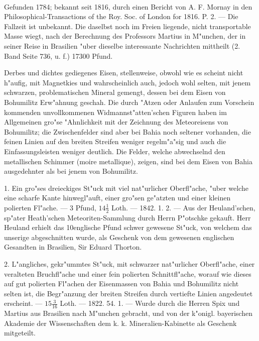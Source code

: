 \documentclass[a4paper, 11pt, oneside, polutonikogreek, german]{article}
\begin{document}
\paragraph{}
Gefunden 1784; bekannt seit 1816, durch einen Bericht von A. F. Mornay in den Philosophical-Transactions of the Roy. Soc. of London for 1816. P. 2. --- Die Fallzeit ist unbekannt. Die daselbst noch im Freien liegende, nicht transportable Masse wiegt, nach der Berechnung des Professors Martius in M"unchen, der in seiner Reise in Brasilien "uber dieselbe interessante Nachrichten mittheilt (2. Band Seite 736, u. f.) 17300 Pfund.

Derbes und dichtes gediegenes Eisen, stellenweise, obwohl wie es scheint nicht h"aufig, mit Magnetkies und wahrscheinlich auch, jedoch wohl selten, mit jenem schwarzen, problematischen Mineral gemengt, dessen bei dem Eisen von Bohumilitz Erw"ahnung geschah. Die durch "Atzen oder Anlaufen zum Vorschein kommenden unvollkommenen Widmannst"atten'schen Figuren haben im Allgemeinen gro"se "Ahnlichkeit mit der Zeichnung des Meteoreisens von Bohumilitz; die Zwischenfelder sind aber bei Bahia noch seltener vorhanden, die feinen Linien auf den breiten Streifen weniger regelm"a"sig und auch die Einfassungsleisten weniger deutlich. Die Felder, welche abwechselnd den metallischen Schimmer (moire metallique), zeigen, sind bei dem Eisen von Bahia ausgedehnter als bei jenem von Bohumilitz.

1. Ein gro"ses dreieckiges St"uck mit viel nat"urlicher Oberfl"ache, "uber welche eine scharfe Kante hinwegl"auft, einer gro"sen ge"atzten und einer kleinen polierten Fl"ache. --- 3 Pfund, $\mathfrak{14\frac{1}{2}}$ Loth. --- 1842. 1. 2. --- Aus der Heuland'schen, sp"ater Heath'schen Meteoriten-Sammlung durch Herrn P"otschke gekauft. Herr Heuland erhielt das 10englische Pfund schwer gewesene St"uck, von welchem das unserige abgeschnitten wurde, als Geschenk von dem gewesenen englischen Gesandten in Brasilien, Sir Eduard Thorton.

2. L"angliches, gekr"ummtes St"uck, mit schwarzer nat"urlicher Oberfl"ache, einer veralteten Bruchfl"ache und einer fein polierten Schnittfl"ache, worauf wie dieses auf gut polierten Fl"achen der Eisenmassen von Bahia und Bohumilitz nicht selten ist, die Begr"anzung der breiten Streifen durch vertiefte Linien angedeutet erscheint. --- $\mathfrak{15\frac{3}{16}}$ Loth. --- 1822. 54. 1. --- Wurde durch die Herren Spix und Martius aus Brasilien nach M"unchen gebracht, und von der k"onigl. bayerischen Akademie der Wissenschaften dem k. k. Mineralien-Kabinette als Geschenk mitgeteilt.
\end{document}
